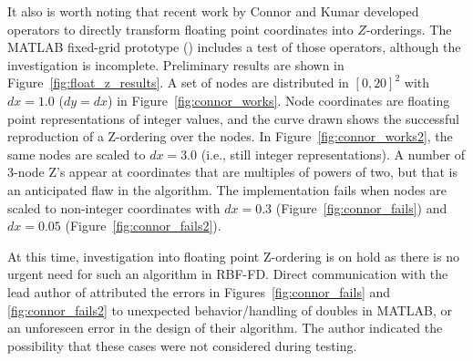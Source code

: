 \documentclass{report}
\begin{document}
It also is worth noting that recent work by Connor and Kumar \cite{Connor2009} developed operators to directly transform floating point coordinates into $Z$-orderings. The MATLAB fixed-grid prototype (\cite{BolligRBFFixedGrid}) includes a test of those operators, although the investigation is incomplete. Preliminary results are shown in Figure~\ref{fig:float_z_results}. A set of nodes are distributed in $[0,20]^2$ with $dx = 1.0$ ($dy = dx$) in Figure~\ref{fig:connor_works}. Node coordinates are floating point representations of integer values, and the curve drawn shows the successful reproduction of a Z-ordering over the nodes. In Figure~\ref{fig:connor_works2}, the same nodes are scaled to $dx = 3.0$ (i.e., still integer representations). A number of 3-node Z's appear at coordinates that are multiples of powers of two, but that  is an anticipated flaw in the algorithm. The implementation fails when nodes are scaled to non-integer coordinates with $dx = 0.3$ (Figure~\ref{fig:connor_fails}) and $dx=0.05$ (Figure~\ref{fig:connor_fails2}). 

At this time, investigation into floating point Z-ordering is on hold as there is no urgent need for such an algorithm in RBF-FD. Direct communication with the lead author of \cite{Connor2009} attributed the errors in Figures~\ref{fig:connor_fails} and \ref{fig:connor_fails2} to unexpected behavior/handling of doubles in MATLAB, or an unforeseen error in the design of their algorithm. The author indicated the possibility that these cases were not considered during testing.
\end{document}
